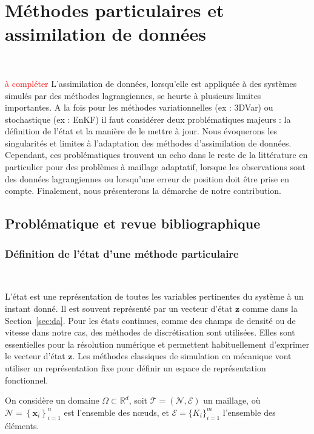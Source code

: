 \chapter{Méthodes particulaires et assimilation de données}~\label{sec:prob_contribution}

\textcolor{red}{à compléter}
L'assimilation de données, lorsqu'elle est appliquée à des systèmes simulés par des méthodes lagrangiennes, se heurte à plusieurs limites importantes. A la fois pour les méthodes variationnelles (ex : 3DVar) ou stochastique (ex : EnKF) il faut considérer deux problématiques majeurs : la définition de l'état et la manière de le mettre à jour.
Nous évoquerons les singularités et limites à l'adaptation des méthodes d'assimilation de données. Cependant, ces problématiques trouvent un echo dans le reste de la littérature en particulier pour des problèmes à maillage adaptatif, lorsque les observations sont des données lagrangiennes ou lorsqu'une erreur de position doit être prise en compte. Finalement, nous présenterons la démarche de notre contribution.

\section{Problématique et revue bibliographique}

\subsection{Définition de l'état d'une méthode particulaire}~\label{sec:etat_meshless}

L'état est une représentation de toutes les variables pertinentes du système à un instant donné. Il est souvent représenté par un vecteur d'état $\bm z$ comme dans la Section~\ref{sec:da}. Pour les états continues, comme des champs de densité ou de vitesse dans notre cas, des méthodes de discrétisation sont utilisées. Elles sont essentielles pour la résolution numérique et permettent habituellement d'exprimer le vecteur d'état $\bm z$. Les méthodes classiques de simulation en mécanique vont utiliser un représentation fixe pour définir un espace de représentation fonctionnel.


On considère un domaine $\Omega \subset \mathbb R^d$, soit $\mathcal{T} = (\mathcal N, \mathcal E)$ un maillage, où $\mathcal N = \left\{\bm x_i \right\}^n_{i=1}$ est l'ensemble des nœuds, et $\mathcal{E} = \{ K_i \}_{i=1}^{m}$ l'ensemble des éléments.

